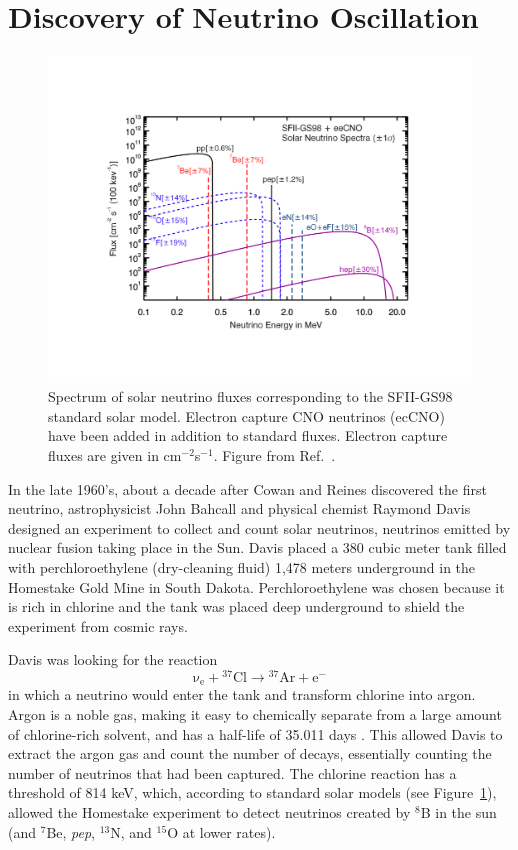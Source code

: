 \section{Discovery of Neutrino Oscillation} \label{sec:NeutrinoOsc}

\begin{figure}[h]
	\centering
	\includegraphics[width=0.7\linewidth]{tex/2-neutrinos-images/SolarFlux}
	\caption{Spectrum of solar neutrino fluxes corresponding to the SFII-GS98 standard solar model. Electron capture CNO neutrinos (ecCNO) have been added in addition to standard fluxes. Electron capture fluxes are given in cm$^{-2}$s$^{-1}$. Figure from Ref.~\cite{Serenelli:2016dgz}.}
	\label{fig:solarflux}
\end{figure}

In the late 1960's, about a decade after Cowan and Reines discovered the first neutrino, astrophysicist John Bahcall and physical chemist Raymond Davis designed an experiment to collect and count solar neutrinos, neutrinos emitted by nuclear fusion taking place in the Sun. 
Davis placed a 380 cubic meter tank filled with perchloroethylene (dry-cleaning fluid) 1,478 meters underground in the Homestake Gold Mine in South Dakota. 
Perchloroethylene was chosen because it is rich in chlorine and the tank was placed deep underground to shield the experiment from cosmic rays. 

Davis was looking for the reaction 
\begin{equation}
	\mathrm{\nu _{e}+ {^{37}Cl} \rightarrow  {^{37}Ar+e^{-}}} 
	\label{eq:ClAr}
\end{equation}
in which a neutrino would enter the tank and transform chlorine into argon. 
Argon is a noble gas, making it easy to chemically separate from a large amount of chlorine-rich solvent, and has a half-life of 35.011 days \cite{NuclideChart}.
This allowed Davis to extract the argon gas and count the number of decays, essentially counting the number of neutrinos that had been captured.
The chlorine reaction has a threshold of 814 keV, which, according to standard solar models (see Figure~\ref{fig:solarflux}), allowed the Homestake experiment to detect neutrinos created by $^8$B in the sun (and $^7$Be, \textit{pep}, $^{13}$N, and $^{15}$O at lower rates).

